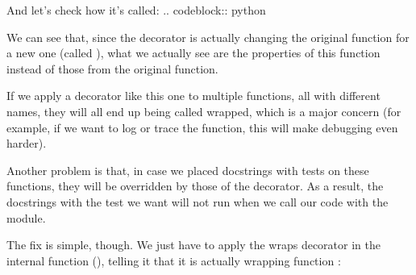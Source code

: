 \documentclass[a4paper,10pt,english]{sphinxmanual}
\begin{document}
And let’s check how it’s called:
.. code\sphinxhyphen{}block:: python

\begin{sphinxVerbatim}[commandchars=\\\{\}]
\end{sphinxVerbatim}

We can see that, since the decorator is actually changing the original function for a new one
(called ), what we actually see are the properties of this function instead of those
from the original function.

If we apply a decorator like this one to multiple functions, all with different names, they
will all end up being called wrapped, which is a major concern (for example, if we want to
log or trace the function, this will make debugging even harder).

Another problem is that, in case we placed docstrings with tests on these functions, they
will be overridden by those of the decorator. As a result, the docstrings with the test we
want will not run when we call our code with the  module.

The fix is simple, though. We just have to apply the wraps decorator in the internal
function (), telling it that it is actually wrapping function :

\begin{sphinxVerbatim}[commandchars=\\\{\}]
 
      
         
          

     
\end{sphinxVerbatim}
\end{document}

